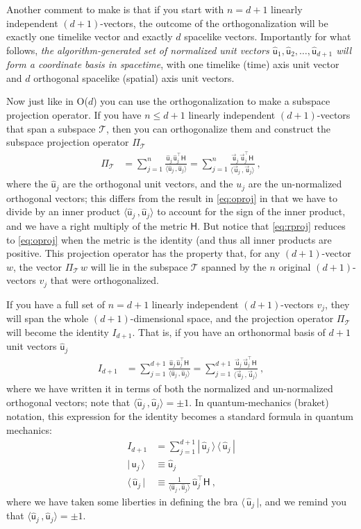 \documentclass{article}
\newcommand{\metric}{\mathsf{H}}
\newcommand\upvec[1]{\!\vec{\,\mathrm{#1}}}
\newcommand{\Lvec}[1]{\upvec{\mathsf{#1}}} %
\newcommand{\Lhat}[1]{\hat{\mathsf{#1}}} %
\newcommand{\inner}[2]{\langle{#1}\,,{#2}\rangle}
\newcommand{\bra}[1]{\langle\,{#1}\,|}
\newcommand{\ket}[1]{|\,{#1}\,\rangle}
\newcommand{\ketbra}[2]{|\,{#1}\,\rangle\,\langle\,{#2}\,|}
\newcommand{\plus}{\!+\!} %
\begin{document}
Another comment to make is that if you start with $n=d+1$ linearly independent $(d\plus1)$-vectors, the outcome of the orthogonalization will be exactly one timelike vector and exactly $d$ spacelike vectors.
Importantly for what follows, \emph{the algorithm-generated set of normalized unit vectors $\Lhat{u}_1,\Lhat{u}_2,\ldots,\Lhat{u}_{d+1}$ will form a coordinate basis in spacetime}, with one timelike (time) axis unit vector and $d$ orthogonal spacelike (spatial) axis unit vectors.

Now just like in O($d$) you can use the orthogonalization to make a subspace projection operator.
If you have $n\leq d+1$ linearly independent $(d\plus1)$-vectors that span a subspace $\mathscr{T}$, then you can orthogonalize them and construct the subspace projection operator $\Pi_\mathscr{T}$
\begin{align}\label{eq:rproj}
    \Pi_\mathscr{T} &= \sum_{j=1}^n \frac{\Lhat{u}_j\,\Lhat{u}_j^\top\metric}{\inner{\Lhat{u}_j}{\Lhat{u}_j}} = \sum_{j=1}^n \frac{\Lvec{u}_j\,\Lvec{u}_j^\top\metric}{\inner{\Lvec{u}_j}{\Lvec{u}_j}} ~,
\end{align}
where the $\Lhat{u}_j$ are the orthogonal unit vectors, and the $u_j$ are the un-normalized orthogonal vectors; this differs from the result in \eqref{eq:oproj} in that we have to divide by an inner product $\inner{\Lhat{u}_j}{\Lhat{u}_j}$ to account for the sign of the inner product, and we have a right multiply of the metric $\metric$.
But notice that \eqref{eq:rproj} reduces to \eqref{eq:oproj} when the metric is the identity (and thus all inner products are positive.
This projection operator has the property that, for any $(d\plus1)$-vector $w$, the vector $\Pi_\mathscr{T}\,w$ will lie in the subspace $\mathscr{T}$ spanned by the $n$ original $(d\plus1)$-vectors $v_j$ that were orthogonalized.

If you have a full set of $n=d+1$ linearly independent $(d\plus1)$-vectors $v_j$, they will span the whole $(d\plus1)$-dimensional space, and the projection operator $\Pi_\mathscr{T}$ will become the identity $I_{d\plus1}$.
That is, if you have an orthonormal basis of $d+1$ unit vectors $\Lhat{u}_j$
\begin{align}
    I_{d\plus1} &= \sum_{j=1}^{d+1} \frac{\Lhat{u}_j\,\Lhat{u}_j^\top\metric}{\inner{\Lhat{u}_j}{\Lhat{u}_j}} = \sum_{j=1}^{d+1} \frac{\Lvec{u}_j\,\Lvec{u}_j^\top\metric}{\inner{\Lvec{u}_j}{\Lvec{u}_j}} ~,
\end{align}
where we have written it in terms of both the normalized and un-normalized orthogonal vectors; note that $\inner{\Lhat{u}_j}{\Lhat{u}_j}=\pm 1$.
In quantum-mechanics (braket) notation, this expression for the identity becomes a standard formula in quantum mechanics:
\begin{align}
    I_{d\plus1} &= \sum_{j=1}^{d+1} \ketbra{\Lhat{u}_j}{\Lhat{u}_j}
    \\
    \ket{\Lhat{u}_j} &\equiv \Lhat{u}_j\label{eq:Lket}
    \\
    \bra{\Lhat{u}_j} &\equiv \frac{1}{\inner{\Lhat{u}_j}{\Lhat{u}_j}}\,\Lhat{u}_j^\top\metric ~,\label{eq:Lbra}
\end{align}
where we have taken some liberties in defining the bra $\bra{\Lhat{u}_j}$, and we remind you that $\inner{\Lhat{u}_j}{\Lhat{u}_j}=\pm 1$.
\end{document}
